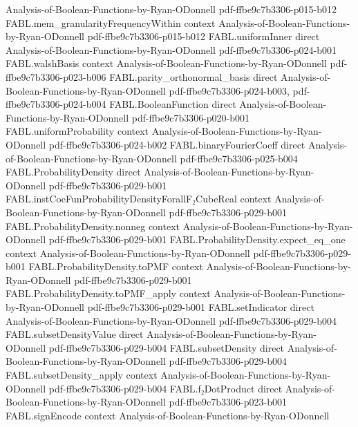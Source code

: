 \begin{theorem}
  {Analysis-of-Boolean-Functions-by-Ryan-ODonnell}
  {pdf-ffbe9c7b3306-p015-b012}
\proofstep
  {FABL.mem_granularityFrequencyWithin}
  {context}
  {Analysis-of-Boolean-Functions-by-Ryan-ODonnell}
  {pdf-ffbe9c7b3306-p015-b012}
\proofstep
  {FABL.uniformInner}
  {direct}
  {Analysis-of-Boolean-Functions-by-Ryan-ODonnell}
  {pdf-ffbe9c7b3306-p024-b001}
\proofstep
  {FABL.walshBasis}
  {context}
  {Analysis-of-Boolean-Functions-by-Ryan-ODonnell}
  {pdf-ffbe9c7b3306-p023-b006}
\proofstep
  {FABL.parity_orthonormal_basis}
  {direct}
  {Analysis-of-Boolean-Functions-by-Ryan-ODonnell}
  {pdf-ffbe9c7b3306-p024-b003,
    pdf-ffbe9c7b3306-p024-b004}
\proofstep
  {FABL.BooleanFunction}
  {direct}
  {Analysis-of-Boolean-Functions-by-Ryan-ODonnell}
  {pdf-ffbe9c7b3306-p020-b001}
\proofstep
  {FABL.uniformProbability}
  {context}
  {Analysis-of-Boolean-Functions-by-Ryan-ODonnell}
  {pdf-ffbe9c7b3306-p024-b002}
\proofstep
  {FABL.binaryFourierCoeff}
  {direct}
  {Analysis-of-Boolean-Functions-by-Ryan-ODonnell}
  {pdf-ffbe9c7b3306-p025-b004}
\proofstep
  {FABL.ProbabilityDensity}
  {direct}
  {Analysis-of-Boolean-Functions-by-Ryan-ODonnell}
  {pdf-ffbe9c7b3306-p029-b001}
\proofstep
  {FABL.instCoeFunProbabilityDensityForallF₂CubeReal}
  {context}
  {Analysis-of-Boolean-Functions-by-Ryan-ODonnell}
  {pdf-ffbe9c7b3306-p029-b001}
\proofstep
  {FABL.ProbabilityDensity.nonneg}
  {context}
  {Analysis-of-Boolean-Functions-by-Ryan-ODonnell}
  {pdf-ffbe9c7b3306-p029-b001}
\proofstep
  {FABL.ProbabilityDensity.expect_eq_one}
  {context}
  {Analysis-of-Boolean-Functions-by-Ryan-ODonnell}
  {pdf-ffbe9c7b3306-p029-b001}
\proofstep
  {FABL.ProbabilityDensity.toPMF}
  {context}
  {Analysis-of-Boolean-Functions-by-Ryan-ODonnell}
  {pdf-ffbe9c7b3306-p029-b001}
\proofstep
  {FABL.ProbabilityDensity.toPMF_apply}
  {context}
  {Analysis-of-Boolean-Functions-by-Ryan-ODonnell}
  {pdf-ffbe9c7b3306-p029-b001}
\proofstep
  {FABL.setIndicator}
  {direct}
  {Analysis-of-Boolean-Functions-by-Ryan-ODonnell}
  {pdf-ffbe9c7b3306-p029-b004}
\proofstep
  {FABL.subsetDensityValue}
  {direct}
  {Analysis-of-Boolean-Functions-by-Ryan-ODonnell}
  {pdf-ffbe9c7b3306-p029-b004}
\proofstep
  {FABL.subsetDensity}
  {direct}
  {Analysis-of-Boolean-Functions-by-Ryan-ODonnell}
  {pdf-ffbe9c7b3306-p029-b004}
\proofstep
  {FABL.subsetDensity_apply}
  {context}
  {Analysis-of-Boolean-Functions-by-Ryan-ODonnell}
  {pdf-ffbe9c7b3306-p029-b004}
\proofstep
  {FABL.f₂DotProduct}
  {direct}
  {Analysis-of-Boolean-Functions-by-Ryan-ODonnell}
  {pdf-ffbe9c7b3306-p023-b001}
\proofstep
  {FABL.signEncode}
  {context}
  {Analysis-of-Boolean-Functions-by-Ryan-ODonnell}

\end{theorem}
